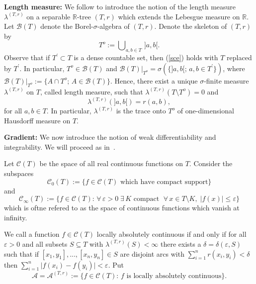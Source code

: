 \documentclass[11pt]{amsart}
\numberwithin{equation}{section}
\begin{document}
{\bf Length measure:}  We follow \cite{EvaPitWin2006} to introduce the notion of the {{\it} length measure}
$\lambda^{(T,r)}$ on a separable ${{\mathbb R}}$-tree $(T,r)$ which extends the
Lebesgue measure on ${{\mathbb R}}$.
Let  $\mathcal B(T)$ denote the Borel-$\sigma$-algebra of $(T,r)$.
Denote the {{\it} skeleton} of $(T,r)$ by
\begin{equation}
\label{sce}
   {T}^o:=\bigcup\nolimits_{a,b\in {T}}\,]a,b[.
\end{equation}
Observe that if
${T}^\prime \subset {T}$ is a
dense countable set, then (\ref{sce}) holds with ${T}$ replaced by
${T}^\prime$. In particular, ${T}^o \in {\mathcal B}({T})$ and
${\mathcal B}({T})\big|_{{T}^o}=\sigma(\{]a,b[;\,a,b\in {T}^\prime\})$, where
${\mathcal B}({T})\big|_{{T}^o}:=\{A \cap {T}^o;\,A\in{\mathcal B}({T})\}$.
Hence, there exist a unique $\sigma$-finite measure $\lambda^{(T,r)}$ on $T$, called
{{\it} length measure}, such that $\lambda^{(T,r)}({T}\setminus {T}^o)=0$ and
\begin{equation}
\label{length}
   \lambda^{(T,r)}(]a,b[)=r(a,b),
\end{equation}
for all $a,b\in T$.
In particular, $\lambda^{(T,r)}$ is the trace onto ${T}^o$ of one-dimensional
Hausdorff measure on $T$. {\smallskip}

 \medskip

{\bf Gradient:} We now introduce the notion of weak differentiability and integrability. We will proceed as in~\cite{Eva00}.

Let ${\mathcal C}(T)$ be the space of all real continuous functions on $T$. Consider the subspaces
\begin{equation}
  {\mathcal C}_0(T):=\big\{f\in {\mathcal C}(T)\mbox{ which have compact support}\big\}
\end{equation}
and
\begin{equation}
\label{e:Cinfty}
   {\mathcal C}_{\infty}(T)
 :=
   \big\{f \in {\mathcal C}(T):\,  \forall\, \varepsilon>0\; \exists\, K \mbox{ compact  }\;\forall\, x \in T\setminus K,\;  |f(x)| \leq \varepsilon\big\}
\end{equation}
which is oftne refered to as the space of continuous functions which {{\it} vanish at infinity}.
{\smallskip}

We call a function $f\in{\mathcal C}(T)$
{{\it} locally absolutely continuous} if and
only if for all $\varepsilon>0$ and all subsets $S\subseteq T$
with $\lambda^{(T,r)}(S)<\infty$
there exists a $\delta=\delta(\varepsilon,S)$ such
that if $[x_1,y_1],...,[x_{n},y_n]\in S$ are disjoint arcs with
$\sum_{i=1}^{n} r(x_i,y_i)<\delta$ then
$\sum_{i=1}^{n}\big|f(x_i)-f(y_i)\big|<\varepsilon$.
Put
\begin{equation}\label{mathcalA}
   {\mathcal A}={\mathcal A}^{(T,r)}
 :=
   \big\{f\in{\mathcal C}(T):\,f\mbox{ is locally absolutely continuous}\big\}.
\end{equation}{\smallskip}
\end{document}
